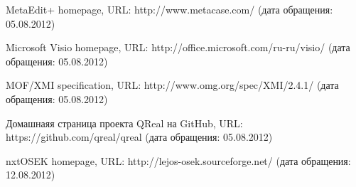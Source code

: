 \documentclass[a4paper]{article}
\begin{document}
\begin{thebibliography}{9001}
   MetaEdit+ homepage, URL: http://www.metacase.com/ (дата обращения: 05.08.2012)
  
   Microsoft Visio homepage, URL: http://office.microsoft.com/ru-ru/visio/ (дата обращения: 05.08.2012)
  
   MOF/XMI specification, URL: http://www.omg.org/spec/XMI/2.4.1/ (дата обращения: 05.08.2012)
  
   Домашнаяя страница проекта QReal на GitHub, URL: https://github.com/qreal/qreal (дата обращения: 05.08.2012)
  
   nxtOSEK homepage, URL: http://lejos-osek.sourceforge.net/ (дата обращения: 12.08.2012)

\end{thebibliography}
\end{document}

